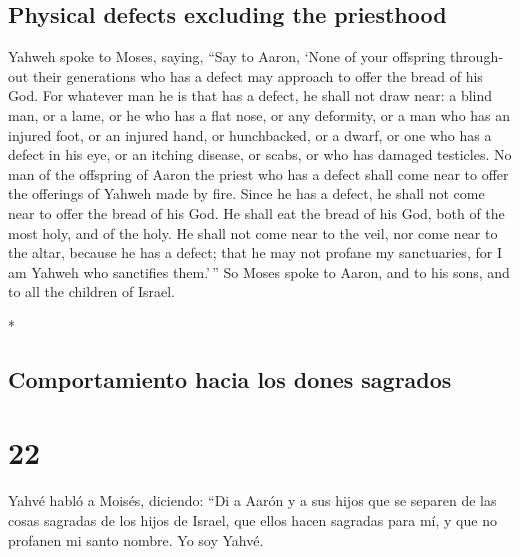 \begin{paracol}{2}
\begin{otherlanguage}{english}
\hypertarget{physical-defects-excluding-the-priesthood}{%
\subsection{Physical defects excluding the
priesthood}\label{physical-defects-excluding-the-priesthood}}

 Yahweh spoke to Moses, saying,  ``Say to
Aaron, `None of your offspring throughout their generations who has a
defect may approach to offer the bread of his God.  For
whatever man he is that has a defect, he shall not draw near: a blind
man, or a lame, or he who has a flat nose, or any deformity,
 or a man who has an injured foot, or an injured hand,
 or hunchbacked, or a dwarf, or one who has a defect in
his eye, or an itching disease, or scabs, or who has damaged testicles.
 No man of the offspring of Aaron the priest who has a
defect shall come near to offer the offerings of Yahweh made by fire.
Since he has a defect, he shall not come near to offer the bread of his
God.  He shall eat the bread of his God, both of the most
holy, and of the holy.  He shall not come near to the
veil, nor come near to the altar, because he has a defect; that he may
not profane my sanctuaries, for I am Yahweh who sanctifies them.'\,''
 So Moses spoke to Aaron, and to his sons, and to all the
children of Israel.

\end{otherlanguage}

\switchcolumn[0]*

\hypertarget{comportamiento-hacia-los-dones-sagrados}{%
\subsection{Comportamiento hacia los dones
sagrados}\label{comportamiento-hacia-los-dones-sagrados}}

\hypertarget{section-42}{%
\section{22}\label{section-42}}

 Yahvé habló a Moisés, diciendo:  ``Di a
Aarón y a sus hijos que se separen de las cosas sagradas de los hijos de
Israel, que ellos hacen sagradas para mí, y que no profanen mi santo
nombre. Yo soy Yahvé.


\end{paracol}
